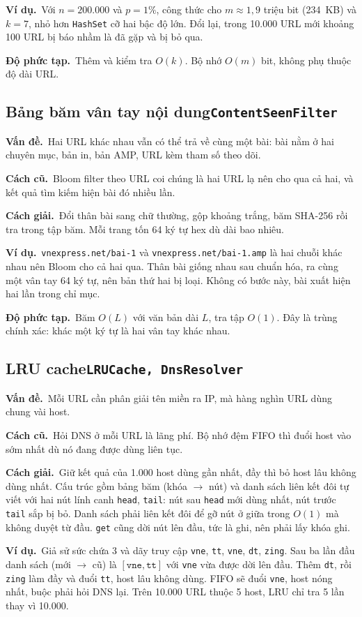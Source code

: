 \documentclass[9pt,twocolumn,a4paper]{extarticle}
\newcommand{\code}[1]{\texttt{#1}}
\newcommand{\dsa}[2]{\subsection[#1]{#1\hfill{\normalfont\footnotesize\code{#2}}}}
\newcommand{\vande}{\textcolor{linkblue}{\textbf{Vấn đề.}}~}
\newcommand{\cachgiai}{\textcolor{linkblue}{\textbf{Cách giải.}}~}
\newcommand{\dpt}{\textcolor{linkblue}{\textbf{Độ phức tạp.}}~}
\newcommand{\cu}{\textcolor{linkblue}{\textbf{Cách cũ.}}~}
\newcommand{\vidu}{\textcolor{linkblue}{\textbf{Ví dụ.}}~}
\begin{document}
\vidu Với $n=200.000$ và $p=1\%$, công thức cho $m\approx1{,}9$ triệu bit (234~KB) và $k=7$, nhỏ hơn \code{HashSet} cỡ hai bậc độ lớn. Đổi lại, trong 10.000 URL mới khoảng 100 URL bị báo nhầm là đã gặp và bị bỏ qua.

\dpt Thêm và kiểm tra $O(k)$. Bộ nhớ $O(m)$ bit, không phụ thuộc độ dài URL.

\dsa{Bảng băm vân tay nội dung}{ContentSeenFilter}
\vande Hai URL khác nhau vẫn có thể trả về cùng một bài: bài nằm ở hai chuyên mục, bản in, bản AMP, URL kèm tham số theo dõi.

\cu Bloom filter theo URL coi chúng là hai URL lạ nên cho qua cả hai, và kết quả tìm kiếm hiện bài đó nhiều lần.

\cachgiai Đổi thân bài sang chữ thường, gộp khoảng trắng, băm SHA-256 rồi tra trong tập băm. Mỗi trang tốn 64 ký tự hex dù dài bao nhiêu.

\vidu \code{vnexpress.net/bai-1} và \code{vnexpress.net/bai-1.amp} là hai chuỗi khác nhau nên Bloom cho cả hai qua. Thân bài giống nhau sau chuẩn hóa, ra cùng một vân tay 64 ký tự, nên bản thứ hai bị loại. Không có bước này, bài xuất hiện hai lần trong chỉ mục.

\dpt Băm $O(L)$ với văn bản dài $L$, tra tập $O(1)$. Đây là trùng chính xác: khác một ký tự là hai vân tay khác nhau.

\dsa{LRU cache}{LRUCache, DnsResolver}
\vande Mỗi URL cần phân giải tên miền ra IP, mà hàng nghìn URL dùng chung vài host.

\cu Hỏi DNS ở mỗi URL là lãng phí. Bộ nhớ đệm FIFO thì đuổi host vào sớm nhất dù nó đang được dùng liên tục.

\cachgiai Giữ kết quả của 1.000 host dùng gần nhất, đầy thì bỏ host lâu không dùng nhất. Cấu trúc gồm bảng băm (khóa $\to$ nút) và danh sách liên kết đôi tự viết với hai nút lính canh \code{head}, \code{tail}: nút sau \code{head} mới dùng nhất, nút trước \code{tail} sắp bị bỏ. Danh sách phải liên kết đôi để gỡ nút ở giữa trong $O(1)$ mà không duyệt từ đầu. \code{get} cũng dời nút lên đầu, tức là ghi, nên phải lấy khóa ghi.

\vidu Giả sử sức chứa 3 và dãy truy cập \code{vne}, \code{tt}, \code{vne}, \code{dt}, \code{zing}. Sau ba lần đầu danh sách (mới $\to$ cũ) là $[\code{vne},\code{tt}]$ với \code{vne} vừa được dời lên đầu. Thêm \code{dt}, rồi \code{zing} làm đầy và đuổi \code{tt}, host lâu không dùng. FIFO sẽ đuổi \code{vne}, host nóng nhất, buộc phải hỏi DNS lại. Trên 10.000 URL thuộc 5 host, LRU chỉ tra 5 lần thay vì 10.000.
\end{document}

